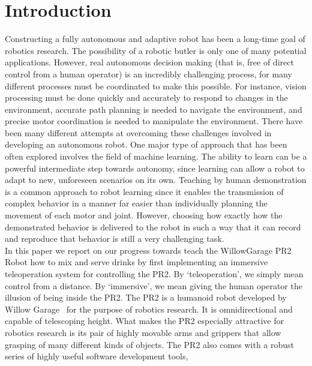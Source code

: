 \documentclass{sig-alternate}
\begin{document}
\section{Introduction}
\label{sec:intro}
\indent Constructing a fully autonomous and adaptive robot has been a long-time goal of robotics research.
The possibility of a robotic butler is only one of many potential applications. However, real
autonomous decision making (that is, free of direct control from a human operator) is an incredibly challenging process, for many different processes must 
be coordinated to make this possible. For instance, vision processing must be done quickly and accurately to respond to 
changes in the environment, accurate path planning is needed to navigate the environment, and 
precise motor coordination is needed to manipulate the environment. There have been many different 
attempts at overcoming these challenges involved in developing an autonomous robot. One major type of approach 
that has been often explored involves the field of machine learning. The ability to learn can be a powerful intermediate 
step towards autonomy, since learning can allow a robot to adapt to new, unforeseen scenarios on its own. 
Teaching by human demonstration is a common approach to robot learning since it enables the 
transmission of complex behavior in a manner far easier than individually planning the movement of each motor and joint. However, choosing how exactly how the demonstrated behavior is delivered to the 
robot in such a way that it can record and reproduce that behavior is still a very challenging task.\\ 
\indent In this paper we report on our progress towards teach the WillowGarage PR2 Robot how to mix and
serve drinks by first implementing an immersive teleoperation system for controlling the PR2. By `teleoperation', we simply mean control from
a distance. By `immersive', we mean giving the human operator the illusion of being inside the PR2. The PR2 is a humanoid robot developed by  Willow Garage~\cite{pr2} for the purpose of robotics 
research. It is omnidirectional and capable of telescoping height. What makes the PR2 especially attractive for robotics research is its pair of highly movable arms and grippers that allow grasping of many different kinds of objects. The PR2 also comes with a robust series of highly useful software development tools,
\end{document}
